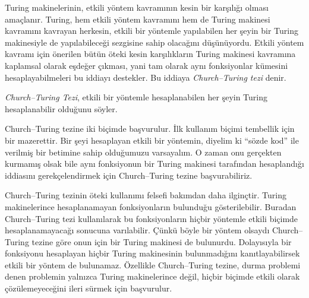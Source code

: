 


Turing makinelerinin, etkili yöntem kavramının kesin bir karşılığı olması
amaçlanır. Turing, hem etkili yöntem kavramını hem de Turing makinesi kavramını
kavrayan herkesin, etkili bir yöntemle yapılabilen her şeyin bir Turing
makinesiyle de yapılabileceği sezgisine sahip olacağını düşünüyordu. Etkili
yöntem kavramı için önerilen bütün öteki kesin karşılıkların Turing makinesi
kavramına kaplamsal olarak eşdeğer çıkması, yani tam olarak aynı fonksiyonlar
kümesini hesaplayabilmeleri bu iddiayı destekler. Bu iddiaya
\emph{Church--Turing tezi} denir.

\begin{defn}
\emph{Church--Turing Tezi}, etkili bir yöntemle hesaplanabilen her şeyin
Turing hesaplanabilir olduğunu söyler.
\end{defn}

Church--Turing tezine iki biçimde başvurulur. İlk kullanım biçimi tembellik
için bir mazerettir. Bir şeyi hesaplayan etkili bir yöntemin, diyelim ki
``sözde kod'' ile verilmiş bir betimine sahip olduğumuzu varsayalım. O zaman
onu gerçekten kurmamış olsak bile aynı fonksiyonun bir Turing makinesi
tarafından hesaplandığı iddiasını gerekçelendirmek için Church--Turing tezine
başvurabiliriz.

Church--Turing tezinin öteki kullanımı felsefi bakımdan daha ilginçtir.
Turing makinelerince hesaplanamayan fonksiyonların bulunduğu gösterilebilir.
Buradan Church--Turing tezi kullanılarak bu fonksiyonların hiçbir yöntemle
etkili biçimde hesaplanamayacağı sonucuna varılabilir. Çünkü böyle bir yöntem
olsaydı Church--Turing tezine göre onun için bir Turing makinesi de bulunurdu.
Dolayısıyla bir fonksiyonu hesaplayan hiçbir Turing makinesinin bulunmadığını
kanıtlayabilirsek etkili bir yöntem de bulunamaz. Özellikle Church--Turing
tezine, durma problemi denen problemin yalnızca Turing makinelerince değil,
hiçbir biçimde etkili olarak çözülemeyeceğini ileri sürmek için başvurulur.

